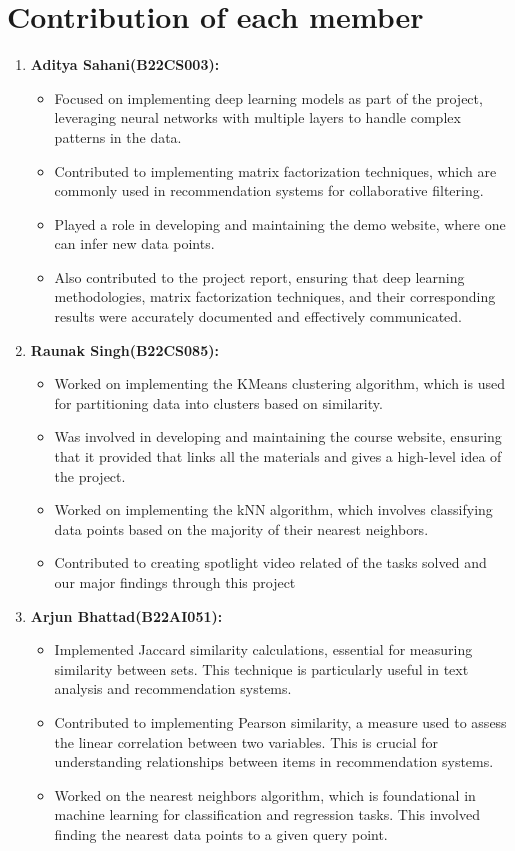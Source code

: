 \documentclass[a4paper]{article}
\theoremstyle{plain}
\theoremstyle{definition}
\begin{document}
	\section{\LARGE Contribution of each member}
	\label{sec:contribution}
	\begin{enumerate}
 
\item \textbf{\large Aditya Sahani(B22CS003):} 
    \begin{itemize}
        \item  Focused on implementing deep learning models as part of the project, leveraging neural networks with multiple layers to handle complex patterns in the data.
        \item Contributed to implementing matrix factorization techniques, which are commonly used in recommendation systems for collaborative filtering.
        \item  Played a role in developing and maintaining the demo website, where one can infer new data points.
        \item  Also contributed to the project report, ensuring that deep learning methodologies, matrix factorization techniques, and their corresponding results were accurately documented and effectively communicated.
    \end{itemize}
    \item \textbf{\large Raunak Singh(B22CS085):} \begin{itemize}
        \item   Worked on implementing the KMeans clustering algorithm, which is used for partitioning data into clusters based on similarity.
        \item  Was involved in developing and maintaining the course website, ensuring that it provided that links all the materials and gives a high-level idea of the project.
        \item   Worked on implementing the kNN algorithm, which involves classifying data points based on the majority of their nearest neighbors.
        \item   Contributed to creating spotlight video related of the tasks solved and our major findings through this project
    \end{itemize}
    \item \textbf{\large Arjun Bhattad(B22AI051):} \begin{itemize}
            \item   Implemented Jaccard similarity calculations, essential for measuring similarity between sets. This technique is particularly useful in text analysis and recommendation systems.
            \item  Contributed to implementing Pearson similarity, a measure used to assess the linear correlation between two variables. This is crucial for understanding relationships between items in recommendation systems.
            \item  Worked on the nearest neighbors algorithm, which is foundational in machine learning for classification and regression tasks. This involved finding the nearest data points to a given query point.


\end{itemize}
\end{enumerate}
\end{document}

